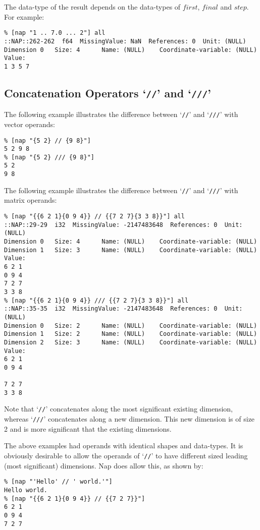  The data-type of the result depends on the data-types of 
  $\mathit{first}$, 
  $\mathit{final}$ and 
  $\mathit{step}$. For example:
  \begin{verbatim}
% [nap "1 .. 7.0 ... 2"] all
::NAP::262-262  f64  MissingValue: NaN  References: 0  Unit: (NULL)
Dimension 0   Size: 4      Name: (NULL)    Coordinate-variable: (NULL)
Value:
1 3 5 7
\end{verbatim}

\subsection{Concatenation Operators `\texttt{//}' and `\texttt{///}'}
    \label{op-Concatenation}
  
 The following example illustrates the difference between `\texttt{//}' and `\texttt{///}' with vector operands:
  \begin{verbatim}
% [nap "{5 2} // {9 8}"]
5 2 9 8
% [nap "{5 2} /// {9 8}"]
5 2
9 8
\end{verbatim}

  
 The following example illustrates the difference between `\texttt{//}' and `\texttt{///}' with matrix operands:
  \begin{verbatim}
% [nap "{{6 2 1}{0 9 4}} // {{7 2 7}{3 3 8}}"] all
::NAP::29-29  i32  MissingValue: -2147483648  References: 0  Unit: (NULL)
Dimension 0   Size: 4      Name: (NULL)    Coordinate-variable: (NULL)
Dimension 1   Size: 3      Name: (NULL)    Coordinate-variable: (NULL)
Value:
6 2 1
0 9 4
7 2 7
3 3 8
% [nap "{{6 2 1}{0 9 4}} /// {{7 2 7}{3 3 8}}"] all
::NAP::35-35  i32  MissingValue: -2147483648  References: 0  Unit: (NULL)
Dimension 0   Size: 2      Name: (NULL)    Coordinate-variable: (NULL)
Dimension 1   Size: 2      Name: (NULL)    Coordinate-variable: (NULL)
Dimension 2   Size: 3      Name: (NULL)    Coordinate-variable: (NULL)
Value:
6 2 1
0 9 4

7 2 7
3 3 8
\end{verbatim}

  
 Note that `\texttt{//}' concatenates along the most significant
  existing dimension, whereas `\texttt{///}' concatenates along a new dimension. This new
  dimension is of size 2 and is more significant that the existing
  dimensions.
  
 The above examples had operands with identical shapes and
  data-types. It is obviously desirable to allow the operands of `\texttt{//}' to have different sized leading (most
  significant) dimensions. Nap does allow this, as shown by:
  \begin{verbatim}
% [nap "'Hello' // ' world.'"]
Hello world.
% [nap "{{6 2 1}{0 9 4}} // {{7 2 7}}"]
6 2 1
0 9 4
7 2 7
\end{verbatim}

